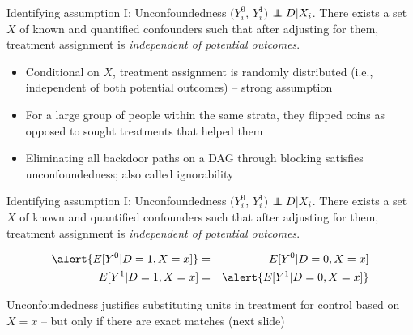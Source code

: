 \documentclass{beamer}
\newcommand\independent{\protect\mathpalette{\protect\independenT}{\perp}}
\def\independenT#1#2{\mathrel{\rlap{$#1#2$}\mkern2mu{#1#2}}}
\begin{document}
\begin{frame}[plain]

	\begin{block}{Identifying assumption I: Unconfoundedness}
	$(Y_i^0$, $Y_i^1)$ $\independent{D} | X_i$. There exists a set $X$ of known and quantified confounders such that after adjusting for them, treatment assignment is \emph{independent of potential outcomes}.
	\end{block}
	
	\begin{itemize}
	\item Conditional on $X$, treatment assignment is randomly distributed (i.e., independent of both potential outcomes) -- strong assumption
	\item For a large group of people within the same strata, they flipped coins as opposed to sought treatments that helped them
	\item Eliminating all backdoor paths on a DAG through blocking satisfies unconfoundedness; also called ignorability
	\end{itemize}
\end{frame}


\begin{frame}[plain]

	\begin{block}{Identifying assumption I: Unconfoundedness}
	$(Y_i^0$, $Y_i^1)$ $\independent{D} | X_i$. There exists a set $X$ of known and quantified confounders such that after adjusting for them, treatment assignment is \emph{independent of potential outcomes}.
	\end{block}
	
	\begin{eqnarray*}
	\alert{E[Y^0 | D=1, X=x]} &=& E[Y^0 | D=0, X=x] \\
	E[Y^1 | D=1, X=x] &=& \alert{E[Y^1 | D=0, X=x] }
	\end{eqnarray*}
	
Unconfoundedness justifies substituting units in treatment for control based on $X=x$ -- but only if there are exact matches (next slide)
	
	
\end{frame}
\end{document}
